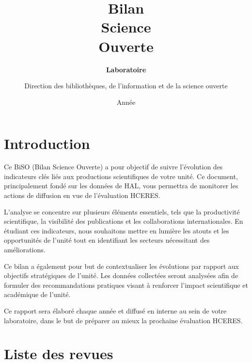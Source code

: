 \documentclass[french, 11pt]{assets/biso}
\title{Bilan \\ Science \\ Ouverte}
\author{Direction des bibliothèques, de l’information et de la science ouverte}
\date{Année \reportyear}
\subtitle{\textbf{Laboratoire \labacronym} \\
  \medskip
  \labfullname
}
\begin{document}
\renewcommand{\arraystretch}{1.5}






\maketitle

\tableofcontents

\pagebreak



\section{Introduction}

Ce BiSO (Bilan Science Ouverte) a pour objectif de suivre l'évolution des indicateurs clés liés aux productions scientifiques de votre unité. Ce document, principalement fondé sur les données de HAL, vous permettra de monitorer les actions de diffusion en vue de l'évaluation HCERES.

L'analyse se concentre sur plusieurs éléments essentiels, tels que la productivité scientifique, la visibilité des publications et les collaborations internationales. En étudiant ces indicateurs, nous souhaitons mettre en
lumière les atouts et les opportunités de l'unité tout en identifiant les secteurs nécessitant des améliorations.

Ce bilan a également pour but de contextualiser les évolutions par rapport aux objectifs stratégiques de l'unité. Les données collectées seront analysées afin de formuler des recommandations pratiques visant à renforcer l'impact
scientifique et académique de l'unité.

Ce rapport sera élaboré chaque année et diffusé en interne au sein de votre laboratoire, dans le but de préparer au mieux la prochaine évaluation HCERES.



\pagebreak

\section{Liste des revues}
\end{document}

